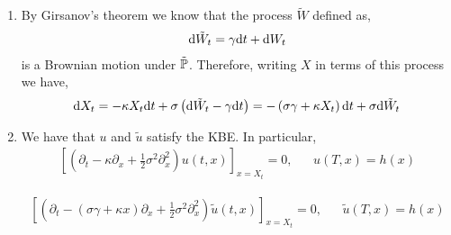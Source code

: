 \begin{solution}[Solution]
\begin{enumerate}[label=(\alph*)]
    \item By Girsanov's theorem we know that the process \( \tilde{W} \) defined as,
        \begin{align*}
            \mathrm{d} \tilde{W}_t = \gamma \mathrm{d} t + \mathrm{d} W_t
        \end{align*}
        is a Brownian motion under \( \tilde{\mathbb{P}} \). Therefore, writing \( X \) in terms of this process we have,
        \begin{align*}
            \mathrm{d} X_t = - \kappa X_t \mathrm{d} t + \sigma \left( \mathrm{d} \tilde{W}_t - \gamma \mathrm{d} t \right) 
            = - \left( \sigma \gamma + \kappa X_t \right) \mathrm{d} t + \sigma \mathrm{d} \tilde{W}_t
        \end{align*}
        
    \item
        We have that \( u \) and \( \tilde{u} \) satisfy the KBE. In particular,
        \begin{align*}
            \left[ \left( \partial_t - \kappa \partial_x + \frac{1}{2}\sigma^2 \partial_x^2 \right)u(t,x)\right]_{x=X_t} =0 , && u(T,x) = h(x)
        \end{align*}
        
        \begin{align*}
            \left[ \left( \partial_t - (\sigma \gamma + \kappa x) \partial_x + \frac{1}{2}\sigma^2 \partial_x^2 \right) \tilde{u}(t,x) \right]_{x=X_t} =0 , && \tilde{u}(T,x) = h(x)
        \end{align*}
        



\end{enumerate}
\end{solution}


